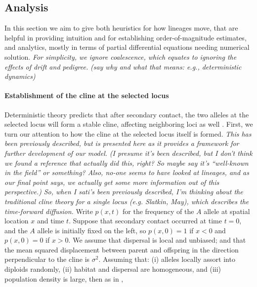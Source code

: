 \documentclass[11pt,letterpaper]{article}
\newcommand{\alisa}[1]{{\em \color{red} #1}}
\newcommand{\plr}[1]{{\em \color{blue} #1}}
\begin{document}
\subsection*{Analysis}

In this section we aim to give both heuristics for how lineages move, 
that are helpful in providing intuition and for establishing order-of-magnitude estimates,
and analytics, mostly in terms of partial differential equations needing numerical solution. 
\alisa{For simplicity, we ignore coalescence, which equates to ignoring the effects of drift and pedigree.}
\plr{(say why and what that means: e.g., deterministic dynamics)}

\paragraph{Establishment of the cline at the selected locus}
Deterministic theory predicts that after secondary contact,
the two alleles at the selected locus will form a stable cline,
affecting neighboring loci as well \citep{barton1979gene, barton1986barrier}.
First, we turn our attention to how the cline at the selected locus itself is formed. 
\alisa{This has been previously described, but is presented here as it provides a framework for further development of our model.}
\plr{(I presume it's been described, but I don't think we found a reference that actually did this, right?  So maybe say it's ``well-known in the field'' or something?  Also, no-one seems to have looked at lineages, and as our final point says, we actually get some more information out of this perspective.)} \alisa{So, when I sati's been previously described, I'm thinking about the traditional cline theory for a single locus (e.g. Slatkin, May), which describes the time-forward diffusion.}
Write $p(x,t)$ for the frequency of the $A$ allele at spatial location $x$ and time $t$.  
Suppose that secondary contact occurred at time $t=0$, 
and the $A$ allele is initially fixed on the left, so
$p(x,0) = 1$ if $x<0$ and $p(x,0)=0$ if $x>0$.
We assume that dispersal is local and unbiased;
and that the mean squared displacement between parent and offspring
in the direction perpendicular to the cline
is $\sigma^2$.
Assuming that: (i) alleles locally assort into diploids randomly, 
(ii) habitat and dispersal are homogeneous,
and (iii) population density is large,
then as in \citet{Bazykin1969},
\end{document}
